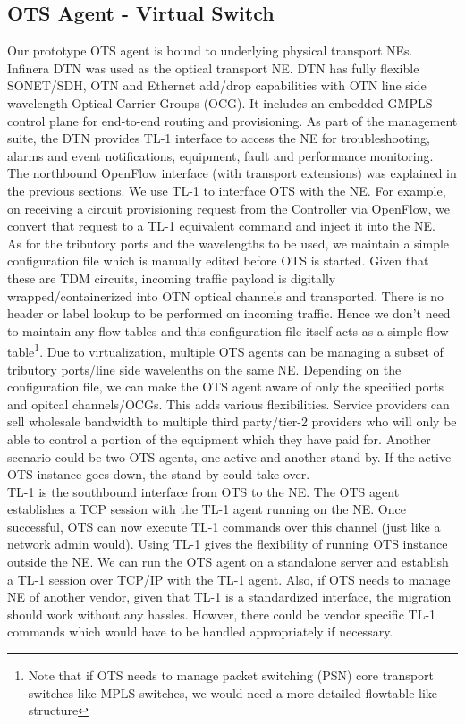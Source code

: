 \documentclass{sig-alternate-10pt}
\begin{document}
	\subsection{OTS Agent - Virtual Switch}
	\label{sec:otvs}
	Our prototype OTS agent is bound to underlying physical transport NEs. Infinera DTN \cite{dtn} was used
	as the optical transport NE. DTN has fully flexible SONET/SDH, OTN and Ethernet add/drop
	capabilities with OTN \cite{otn} line side wavelength Optical Carrier Groups (OCG). It includes an
	embedded GMPLS control plane for end-to-end routing and provisioning. As part of the management suite,
	the DTN provides TL-1 interface to access the NE for troubleshooting, alarms and event
	notifications, equipment, fault and performance monitoring. The northbound OpenFlow interface (with
	transport extensions) was explained in the previous sections. We use TL-1 to interface OTS with the NE.
	For example, on receiving a circuit provisioning request from the Controller via OpenFlow, we convert
	that request to a TL-1 equivalent command and inject it into the NE. \\

	As for the tributory ports and the wavelengths to be used, we maintain a simple configuration file which
	is manually edited before OTS is started. Given that these are TDM circuits, incoming traffic payload is
	digitally wrapped/containerized into OTN optical channels and transported. There is no header or label
	lookup to be performed on incoming traffic. Hence we don't need to maintain any flow tables and this
	configuration file itself acts as a simple flow table\footnote{Note that if OTS needs to manage packet
	switching (PSN) core transport switches like MPLS switches, we would need a more detailed flowtable-like
	structure}. Due to virtualization, multiple OTS agents can be managing a subset of tributory ports/line
	side wavelenths on the same NE. Depending on the configuration file, we can make the OTS agent aware of
	only the specified ports and opitcal channels/OCGs. This adds various flexibilities. Service providers
	can sell wholesale bandwidth to multiple third party/tier-2 providers who will only be able to control a
	portion of the equipment which they have paid for. Another scenario could be two OTS agents, one active
	and another stand-by. If the active OTS instance goes down, the stand-by could take over.\\

	TL-1 is the southbound interface from OTS to the NE. The OTS agent establishes a TCP session with
	the TL-1 agent running on the NE. Once successful, OTS can now execute TL-1 commands over this
	channel (just like a network admin would). Using TL-1 gives the flexibility of running OTS instance
	outside the NE. We can run the OTS agent on a standalone server and establish a TL-1 session over
	TCP/IP with the TL-1 agent. Also, if OTS needs to manage NE of another vendor, given that TL-1 is a
	standardized interface, the migration should work without any hassles. Howver, there could be vendor 
	specific TL-1 commands which would have to be handled appropriately if necessary.
\end{document}
